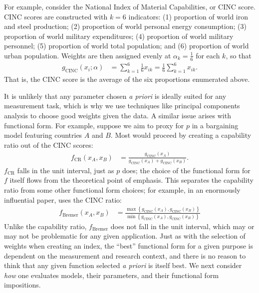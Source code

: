For example, consider the National Index of Material Capabilities, or CINC score.
CINC scores are constructed with $k = 6$ indicators:  (1) proportion of world iron and steel production; (2) proportion of world personal energy consumption; (3) proportion of world military expenditures; (4) proportion of world military personnel; (5) proportion of world total population; and (6) proportion of world urban population.
Weights are then assigned evenly at $\alpha_k = \frac{1}{6}$ for each $k$, so that
\begin{align*}
  g_{\text{CINC}}(x_i; \alpha) &= \sum_{k=1}^6 \frac{1}{6} x_{ik} = \frac{1}{6}\sum_{k=1}^6  x_{ik}.
\end{align*}
That is, the CINC score is the average of the six proportions enumerated above.

It is unlikely that any parameter chosen \emph{a priori} is ideally suited for any measurement task, which is why we use techniques like principal components analysis to choose good weights given the data.
A similar issue arises with functional form.
For example, suppose we aim to proxy for $p$ in a bargaining model featuring countries $A$ and $B$.
Most would proceed by creating a capability ratio out of the CINC scores:
\begin{align*}
	f_{\text{CR}}(x_A, x_B) &= \frac{g_{\text{CINC}}(x_A)}{g_{\text{CINC}}(x_A) + g_{\text{CINC}}(x_B)}.
\end{align*}
$f_{\text{CR}}$ falls in the unit interval, just as $p$ does; the choice of the functional form for $f$ itself flows from the theoretical point of emphasis.
This separates the capability ratio from some other functional form choices; for example, in an enormously influential paper, \citet{bremer1992} uses the CINC ratio:
\begin{align*}
	f_{\text{Bremer}}(x_A, x_B) &= \frac{\max\left\{ g_{\text{CINC}}(x_A), g_{\text{CINC}}(x_B) \right\}}{ \min \left\{ g_{\text{CINC}}(x_A), g_{\text{CINC}}(x_B) \right\}}
\end{align*}
Unlike the capability ratio, $f_{\text{Bremer}}$ does not fall in the unit interval, which may or may not be problematic for any given application.
Just as with the selection of weights when creating an index, the ``best'' functional form for a given purpose is dependent on the measurement and research context, and there is no reason to think that any given function selected \emph{a priori} is itself best.
We next consider \emph{how} one evaluates models, their parameters, and their functional form impositions.

